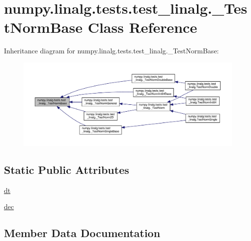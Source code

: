 \hypertarget{classnumpy_1_1linalg_1_1tests_1_1test__linalg_1_1__TestNormBase}{}\section{numpy.\+linalg.\+tests.\+test\+\_\+linalg.\+\_\+\+Test\+Norm\+Base Class Reference}
\label{classnumpy_1_1linalg_1_1tests_1_1test__linalg_1_1__TestNormBase}


Inheritance diagram for numpy.\+linalg.\+tests.\+test\+\_\+linalg.\+\_\+\+Test\+Norm\+Base\+:
\nopagebreak
\begin{figure}[H]
\begin{center}
\leavevmode
\includegraphics[width=350pt]{classnumpy_1_1linalg_1_1tests_1_1test__linalg_1_1__TestNormBase__inherit__graph}
\end{center}
\end{figure}
\subsection*{Static Public Attributes}
\begin{DoxyCompactItemize}
\item 
\hyperlink{classnumpy_1_1linalg_1_1tests_1_1test__linalg_1_1__TestNormBase_a88e7a32a9960437771c5ec53e14268c0}{dt}
\item 
\hyperlink{classnumpy_1_1linalg_1_1tests_1_1test__linalg_1_1__TestNormBase_a1a57c3ba5b85208ed50257ba5b411436}{dec}
\end{DoxyCompactItemize}


\subsection{Member Data Documentation}
\mbox{\label{classnumpy_1_1linalg_1_1tests_1_1test__linalg_1_1__TestNormBase_a1a57c3ba5b85208ed50257ba5b411436}} 
